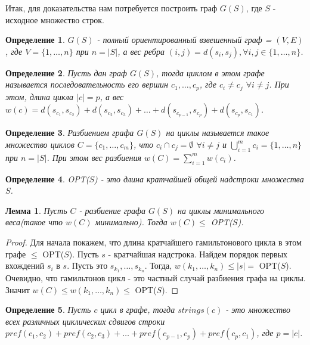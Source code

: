 \documentclass[a4paper,10pt]{article}
\newtheorem{lemma}{Лемма}
\newtheorem{definition}{Определение}
\begin{document}
Итак, для доказательства нам потребуется построить граф $G(S)$, где $S$ - исходное множество строк. 

\begin{definition}
$G(S)$ - полный ориентированный взвешенный граф = $(V, E)$, где $V = \{ 1, \dots, n \}$ при $n = |S|$, а вес ребра $(i, j) = d(s_i, s_j), \forall i,j \in \{ 1, \dots, n \}$.
\end{definition}

\begin{definition}
Пусть дан граф $G(S)$, тогда циклом в этом графе называется последовательность его вершин $c_1, \dots, c_p$, где $c_i \ne c_j$ $\forall i \ne j$.
При этом, длина цикла $|c| = p$, а вес $w(c) = d(s_{c_1}, s_{c_2}) + d(s_{c_2}, s_{c_3}) + \dots + d(s_{c_{p-1}}, s_{c_p}) + d(s_{c_p}, s_{c_1})$.
\end{definition}

\begin{definition}
Разбиением графа $G(S)$ на циклы называется такое множество циклов $C = \{ c_1, \dots, c_m \}$, 
что $c_i \cap c_j = \emptyset$ $\forall i \ne j$ и $\bigcup\limits_{i=1}^m c_i = \{ 1, \dots, n \}$ при $n = |S|$.
При этом вес разбиения $w(C) = \sum\limits_{i=1}^m w(c_i)$.
\end{definition}

\begin{definition}
OPT($S$) - это длина кратчайшей общей надстроки множества $S$.
\end{definition}

\begin{lemma}
Пусть $C$ - разбиение графа $G(S)$ на циклы минимального веса(такое что $w(C)$ минимально).
Тогда $w(C) \leq$ OPT($S$).
\end{lemma}

\begin{proof}
Для начала покажем, что длина кратчайшего гамильтонового цикла в этом графе $\leq$ OPT($S$).
Пусть $s$ - кратчайшая надстрока. Найдем порядок первых вхождений $s_i$ в $s$. Пусть это $s_{k_1}, \dots, s_{k_n}$.
Тогда, $w(k_1, \dots, k_n) \leq |s| =$ OPT($S$). Очевидно, что гамильтонов цикл - это частный случай разбиения графа на циклы.
Значит $w(C) \leq w(k_1, \dots, k_n) \leq$ OPT($S$).
\end{proof}

\begin{definition}
Пусть $c$ цикл в графе, тогда $strings(c)$ - это множество всех различных циклических сдвигов строки 
$pref(c_1, c_2)+pref(c_2, c_3)+\dots+pref(c_{p-1}, c_p)+pref(c_p, c_1)$, где $p = |c|$.
\end{definition}
\end{document}
